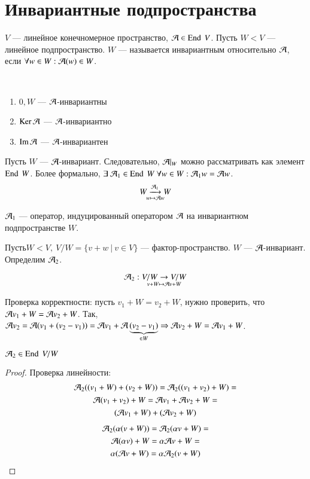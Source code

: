 \documentclass[main]{subfiles}
\begin{document}
\chapter{Инвариантные подпространства}

\begin{definition} 
    $V$ — линейное конечномерное пространство, $\mathcal{A}\in \operatorname{End} \ V$. Пусть $W  < V$ — линейное подпространство.
    $W$ — называется инвариантным относительно $\mathcal{A}$, если $\forall w\in W : \mathcal{A}(w) \in W$.
\end{definition}

\begin{propertylist}
    \
    \begin{enumerate}
        \item $0, W$ — $\mathcal{A}$-инвариантны
        \item $\operatorname{Ker} \mathcal{A}$ — $\mathcal{A}$-инвариантно
        \item $\operatorname{Im} \mathcal{A}$ — $\mathcal{A}$-инвариантен
    \end{enumerate}
\end{propertylist}



Пусть $W$ — $\mathcal{A}$-инвариант. Следовательно, $\mathcal{A}|_W$ можно рассматривать как элемент $\operatorname{End} \ W$.
Более формально, $\exists\  \mathcal{A}_1 \in \operatorname{End} \ W \ \forall w \in W : \mathcal{A}_1 w=\mathcal{A} w$.
\[\underset{w\mapsto \mathcal{A} w}{W\xrightarrow{\mathcal{A}_1} W}\]

$\mathcal{A}_1$  —  оператор, индуцированный оператором $\mathcal{A}$ на инвариантном подпространстве $W$.

$Пусть W < V,\ V/W = \{ v+w \ | \ v \in V\}$ — фактор-пространство.  $W$ — $\mathcal{A}$-инвариант.
Определим $\mathcal{A}_2$.

\[\mathcal{A}_2: \underset{v+W \mapsto \mathcal{A} v+W}{V/W \rightarrow V/W }\]

Проверка корректности: пусть $v_1+W = v_2+W$, нужно проверить, что $\mathcal{A} v_1+W=\mathcal{A} v_2 + W$. Так, $\mathcal{A} v_2= \mathcal{A}(v_1+(v_2-v_1))=\mathcal{A} v_1+ \mathcal{A}\underbrace{(v_2-v_1)}_{\in W} \Rightarrow
    \mathcal{A} v_2 + W= \mathcal{A} v_1+W$.

\begin{proposition} {}
    $\mathcal{A}_2 \in \operatorname{End} \ V/W$
\end{proposition}

\begin{proof}
    Проверка линейности:
    \begin{multline*}
        \mathcal{A}_2((v_1+W)+(v_2+W))= \mathcal{A}_2((v_1+v_2)+W)=\\
        \mathcal{A}(v_1+v_2)+W=  \mathcal{A} v_1+\mathcal{A} v_2+W=\\
        (\mathcal{A} v_1+W)+(\mathcal{A} v_2+W)
    \end{multline*}
    \begin{multline*}
        \mathcal{A}_2(\alpha(v+W))= \mathcal{A}_2(\alpha v+W)=\\
        \mathcal{A}(\alpha v)+W= \alpha \mathcal{A} v +W=\\
        \alpha(\mathcal{A} v +W) = \alpha \mathcal{A}_2(v+W)
    \end{multline*}
\end{proof}
\end{document}
